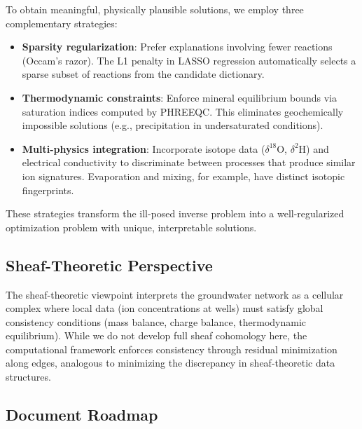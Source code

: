 \documentclass[12pt,a4paper]{article}
\theoremstyle{plain}
\theoremstyle{definition}
\theoremstyle{remark}
\begin{document}
To obtain meaningful, physically plausible solutions, we employ three complementary strategies:

\begin{itemize}
	\item \textbf{Sparsity regularization}: Prefer explanations involving fewer reactions (Occam's razor). The L1 penalty in LASSO regression automatically selects a sparse subset of reactions from the candidate dictionary.
	\item \textbf{Thermodynamic constraints}: Enforce mineral equilibrium bounds via saturation indices computed by PHREEQC. This eliminates geochemically impossible solutions (e.g., precipitation in undersaturated conditions).
	\item \textbf{Multi-physics integration}: Incorporate isotope data ($\delta^{18}$O, $\delta^2$H) and electrical conductivity to discriminate between processes that produce similar ion signatures. Evaporation and mixing, for example, have distinct isotopic fingerprints.
\end{itemize}

These strategies transform the ill-posed inverse problem into a well-regularized optimization problem with unique, interpretable solutions.
\newpage
\subsection{Sheaf-Theoretic Perspective}

The sheaf-theoretic viewpoint interprets the groundwater network as a cellular complex where local data (ion concentrations at wells) must satisfy global consistency conditions (mass balance, charge balance, thermodynamic equilibrium). While we do not develop full sheaf cohomology here, the computational framework enforces consistency through residual minimization along edges, analogous to minimizing the discrepancy in sheaf-theoretic data structures.

\subsection{Document Roadmap}
\end{document}
